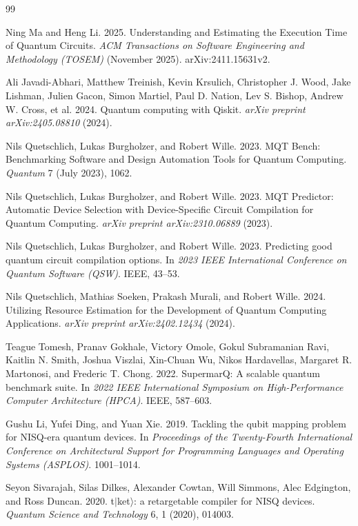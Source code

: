 \documentclass[11pt, a4paper]{article}
\begin{document}
\begin{thebibliography}{99}

Ning Ma and Heng Li. 2025. Understanding and Estimating the Execution Time of Quantum Circuits. \textit{ACM Transactions on Software Engineering and Methodology (TOSEM)} (November 2025). arXiv:2411.15631v2.

Ali Javadi-Abhari, Matthew Treinish, Kevin Krsulich, Christopher J. Wood, Jake Lishman, Julien Gacon, Simon Martiel, Paul D. Nation, Lev S. Bishop, Andrew W. Cross, et al. 2024. Quantum computing with Qiskit. \textit{arXiv preprint arXiv:2405.08810} (2024).

Nils Quetschlich, Lukas Burgholzer, and Robert Wille. 2023. MQT Bench: Benchmarking Software and Design Automation Tools for Quantum Computing. \textit{Quantum} 7 (July 2023), 1062.

Nils Quetschlich, Lukas Burgholzer, and Robert Wille. 2023. MQT Predictor: Automatic Device Selection with Device-Specific Circuit Compilation for Quantum Computing. \textit{arXiv preprint arXiv:2310.06889} (2023).

Nils Quetschlich, Lukas Burgholzer, and Robert Wille. 2023. Predicting good quantum circuit compilation options. In \textit{2023 IEEE International Conference on Quantum Software (QSW)}. IEEE, 43--53.

Nils Quetschlich, Mathias Soeken, Prakash Murali, and Robert Wille. 2024. Utilizing Resource Estimation for the Development of Quantum Computing Applications. \textit{arXiv preprint arXiv:2402.12434} (2024).

Teague Tomesh, Pranav Gokhale, Victory Omole, Gokul Subramanian Ravi, Kaitlin N. Smith, Joshua Viszlai, Xin-Chuan Wu, Nikos Hardavellas, Margaret R. Martonosi, and Frederic T. Chong. 2022. SupermarQ: A scalable quantum benchmark suite. In \textit{2022 IEEE International Symposium on High-Performance Computer Architecture (HPCA)}. IEEE, 587--603.

Gushu Li, Yufei Ding, and Yuan Xie. 2019. Tackling the qubit mapping problem for NISQ-era quantum devices. In \textit{Proceedings of the Twenty-Fourth International Conference on Architectural Support for Programming Languages and Operating Systems (ASPLOS)}. 1001--1014.

Seyon Sivarajah, Silas Dilkes, Alexander Cowtan, Will Simmons, Alec Edgington, and Ross Duncan. 2020. t$|$ket$\rangle$: a retargetable compiler for NISQ devices. \textit{Quantum Science and Technology} 6, 1 (2020), 014003.


\end{thebibliography}
\end{document}
